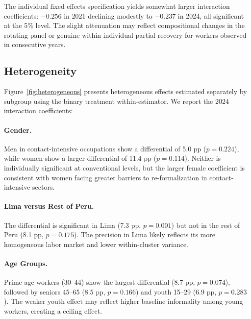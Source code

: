 The individual fixed effects specification yields somewhat larger interaction coefficients: $-0.256$ in 2021 declining modestly to $-0.237$ in 2024, all significant at the 5\% level. The slight attenuation may reflect compositional changes in the rotating panel or genuine within-individual partial recovery for workers observed in consecutive years.

\subsection{Heterogeneity}

Figure~\ref{fig:heterogeneous} presents heterogeneous effects estimated separately by subgroup using the binary treatment within-estimator. We report the 2024 interaction coefficients:

\paragraph{Gender.} Men in contact-intensive occupations show a differential of 5.0 pp ($p = 0.224$), while women show a larger differential of 11.4 pp ($p = 0.114$). Neither is individually significant at conventional levels, but the larger female coefficient is consistent with women facing greater barriers to re-formalization in contact-intensive sectors.

\paragraph{Lima versus Rest of Peru.} The differential is significant in Lima (7.3 pp, $p = 0.001$) but not in the rest of Peru (8.1 pp, $p = 0.175$). The precision in Lima likely reflects its more homogeneous labor market and lower within-cluster variance.

\paragraph{Age Groups.} Prime-age workers (30--44) show the largest differential (8.7 pp, $p = 0.074$), followed by seniors 45--65 (8.5 pp, $p = 0.166$) and youth 15--29 (6.9 pp, $p = 0.283$). The weaker youth effect may reflect higher baseline informality among young workers, creating a ceiling effect.
